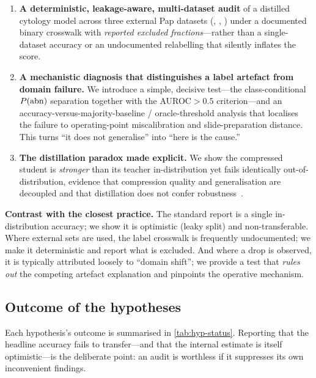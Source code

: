 \begin{enumerate}[leftmargin=1.5em,itemsep=2pt,topsep=2pt]
\item \textbf{A deterministic, leakage-aware, multi-dataset audit} of a distilled cytology model
across three external Pap datasets (\herlev, \apacc, \hicervix) under a documented binary crosswalk
with \emph{reported excluded fractions}---rather than a single-dataset accuracy or an undocumented
relabelling that silently inflates the score.
\item \textbf{A mechanistic diagnosis that distinguishes a label artefact from domain failure.} We
introduce a simple, decisive test---the class-conditional $P(\mathrm{abn})$ separation together with the
AUROC$>0.5$ criterion---and an accuracy-versus-majority-baseline / oracle-threshold analysis that
localises the failure to operating-point miscalibration and slide-preparation distance. This turns
``it does not generalise'' into ``here is the cause.''
\item \textbf{The distillation paradox made explicit.} We show the compressed student is
\emph{stronger} than its teacher in-distribution yet fails identically out-of-distribution, evidence
that compression quality and generalisation are decoupled and that distillation does not confer
robustness~\cite{geirhos2020shortcut}.
\end{enumerate}

\noindent\textbf{Contrast with the closest practice.} The standard report is a single in-distribution
accuracy; we show it is optimistic (leaky split) and non-transferable. Where external sets are used,
the label crosswalk is frequently undocumented; we make it deterministic and report what is excluded.
And where a drop is observed, it is typically attributed loosely to ``domain shift''; we provide a
test that \emph{rules out} the competing artefact explanation and pinpoints the operative mechanism.

\subsection{Outcome of the hypotheses}
\label{sec:hyp-status}

Each hypothesis's outcome is summarised in \cref{tab:hyp-status}. Reporting that the headline accuracy
fails to transfer---and that the internal estimate is itself optimistic---is the deliberate point: an
audit is worthless if it suppresses its own inconvenient findings.

